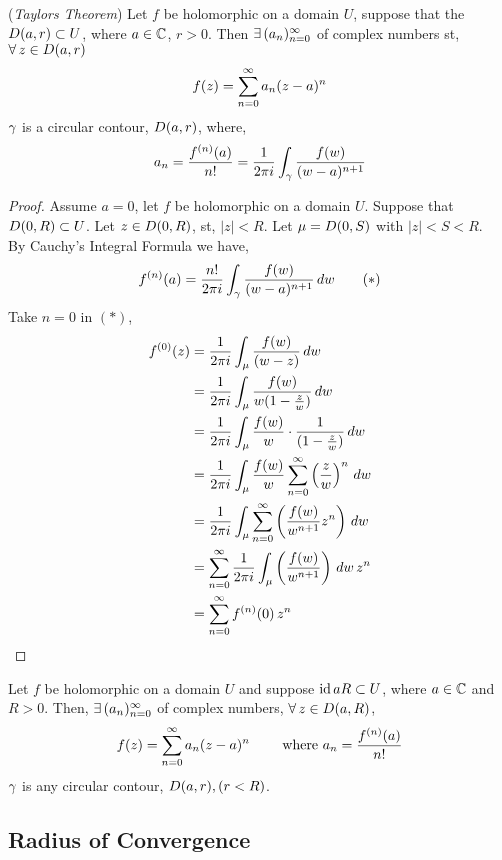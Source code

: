\documentclass{article}
\begin{document}
\begin{nthm}{(\textit{Taylors Theorem})}
  Let $f$ be holomorphic on a domain $U$, suppose that the $D(a, r) \subset U$, where $a\in\mathbb{C}$, $r > 0$. Then $\exists\, (a_n)_{n=0}^{\infty}$ of complex numbers st, $\forall\, z\in D(a, r)$
  $$ f(z) = \sum_{n=0}^\infty a_n(z-a)^n $$
  $\gamma$ is a circular contour, $D(a, r)$, where,
  $$ a_n = \frac{f^{(n)}(a)}{n!} = \frac{1}{2\pi i}\int_\gamma {\frac{f(w)}{(w - a)^{n+1}}} $$
\end{nthm}

\begin{proof}
  Assume $a = 0$, let $f$ be holomorphic on a domain $U$. Suppose that $D(0, R) \subset U$. Let $z \in D(0, R)$, st, $|z| < R$. Let $\mu = D(0, S)$ with $|z| < S < R$.\\

  \noindent
  By Cauchy's Integral Formula we have,
  \begin{equation}
    f^{(n)}(a) = \frac{n!}{2\pi i}\int_\gamma {\frac{f(w)}{(w - a)^{n+1}}}\, dw \tag{$*$}
  \end{equation}
  Take $n = 0$ in $(*)$,
  \begin{align*}
    f^{(0)}(z) &= \frac{1}{2\pi i}\int_\mu \frac{f(w)}{(w- z)}\,dw\\
    &= \frac{1}{2\pi i}\int_\mu \frac{f(w)}{w(1- \frac{z}{w})}\,dw\\
    &= \frac{1}{2\pi i}\int_\mu \frac{f(w)}{w}\cdot\frac{1}{(1- \frac{z}{w})}\,dw\\
    &= \frac{1}{2\pi i}\int_\mu \frac{f(w)}{w}\sum_{n=0}^\infty \left( \frac{z}{w} \right)^n\,dw\\
    &= \frac{1}{2\pi i}\int_\mu \sum_{n=0}^\infty\left(\frac{f(w)}{w^{n+1}} z^n \right)\,dw\\
    &= \sum_{n=0}^\infty \frac{1}{2\pi i} \int_\mu \left(\frac{f(w)}{w^{n+1}} \right)\,dw\, z^n \\
    &= \sum_{n=0}^\infty f^{(n)}(0)\,z^n
  \end{align*}
\end{proof}

Let $f$ be holomorphic on a domain $U$ and suppose $\operatorname{id} a R \subset U$, where $a\in\mathbb{C}$ and $R>0$. Then, $\exists\, (a_n)_{n=0}^\infty$ of complex numbers, $\forall\, z\in D(a, R)$,
$$ f(z) = \sum_{n=0}^\infty {a_n(z-a)^n} \qquad \text{ where } a_n = \frac{f^{(n)}(a)}{n!} $$
$\gamma$ is any circular contour, $D(a, r), (r < R)$.

\subsection{Radius of Convergence}
\end{document}
